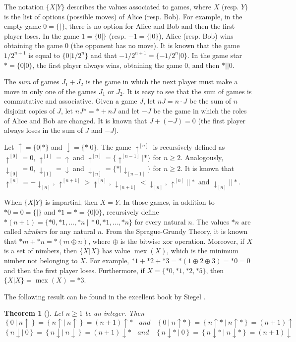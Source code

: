 \documentclass[a4paper,11pt]{article}
\newtheorem{theorem}{Theorem}
\DeclareMathOperator{\mex}{mex}
\newcommand{\xor}{\oplus}
\begin{document}
The notation $\{X|Y\}$ describes the values associated to games, where $X$ (resp. $Y$) is the list of options (possible moves) of Alice (resp. Bob).
For example, in the empty game $0=\{|\}$, there is no option for Alice and Bob and then the first player loses.
In the game $1=\{0|\}$ (resp. $-1=\{|0\}$), Alice (resp. Bob) wins obtaining the game $0$ (the opponent has no move).
It is known that the game $1/2^{n+1}$ is equal to $\{0|1/2^n\}$ and that $-1/2^{n+1}=\{-1/2^n|0\}$.
In the game star $*=\{0|0\}$, the first player always wins, obtaining the game $0$, and then $*||0$.

The \emph{sum} of games $J_1+J_2$ is the game in which the next player must make a move in only one of the games $J_1$ or $J_2$. It is easy to see that the sum of games is commutative and associative.
Given a game $J$, let $nJ=n\cdot J$ be the sum of $n$ disjoint copies of $J$, let $nJ*=*+nJ$ and let $-J$ be the game in which the roles of Alice and Bob are changed.
It is known that $J+(-J)=0$ (the first player always loses in the sum of $J$ and $-J$).

Let $\uparrow=\{0|*\}$ and $\downarrow=\{*|0\}$.
The game $\uparrow^{[n]}$ is recursively defined as $\uparrow^{[0]}=0$, $\uparrow^{[1]}=\uparrow$ and $\uparrow^{[n]}=\{\uparrow^{[n-1]}|*\}$ for $n\geq 2$.
Analogously, $\downarrow_{[0]}=0$, $\downarrow_{[1]}=\downarrow$ and $\downarrow_{[n]}=\{*|\downarrow_{[n-1]}\}$ for $n\geq 2$.
It is known that $\uparrow^{[n]}=-\downarrow_{[n]}$, $\uparrow^{[n+1]}>\uparrow^{[n]}$, $\downarrow_{[n+1]}<\downarrow_{[n]}$, $\uparrow^{[n]}||*$ and $\downarrow_{[n]}||*$.


When $\{X|Y\}$ is impartial, then $X=Y$. In those games, in addition to $*0=0=\{|\}$ and $*1=*=\{0|0\}$, recursively define $*(n+1)=\{*0,*1,\ldots,*n\ |\ *0,*1,\ldots,*n\}$ for every natural $n$. The values $*n$ are called \emph{nimbers} for any natural $n$.
From the Sprague-Grundy Theory, it is known that $*m+*n=*(m\xor n)$, where $\xor$ is the bitwise xor operation. Moreover, if $X$ is a set of nimbers, then $\{X|X\}$ has value $\mex(X)$, which is the minimum nimber not belonging to $X$. For example, $*1+*2+*3=*(1\xor 2\xor 3)=*0=0$ and then the first player loses. Furthermore, if $X=\{*0,*1,*2,*5\}$, then $\{X|X\}=\mex(X)=*3$.

The following result can be found in the excellent book by Siegel \cite{siegel13}.

\begin{theorem}[\cite{siegel13}]\label{thm-basic1}
Let $n\geq 1$ be an integer. Then
\[
\left\{0\ \big|\ n\uparrow\right\} = \left\{n\uparrow \big|\ n\uparrow\right\} = (n+1)\uparrow*\ \ \ \ and\ \ \ \ \left\{0\ \big|\ n\uparrow*\right\} = \left\{n\uparrow*\ \big|\ n\uparrow*\right\} = (n+1)\uparrow
\]
\[
\left\{n\downarrow \big|\ 0\right\} = \left\{n\downarrow \big|\ n\downarrow\right\} = (n+1)\downarrow*\ \ \ \ and\ \ \ \ \left\{n\downarrow*\ \big|\ 0\right\} = \left\{n\downarrow*\ \big|\ n\downarrow*\right\} = (n+1)\downarrow
\]
\end{theorem}
\end{document}
